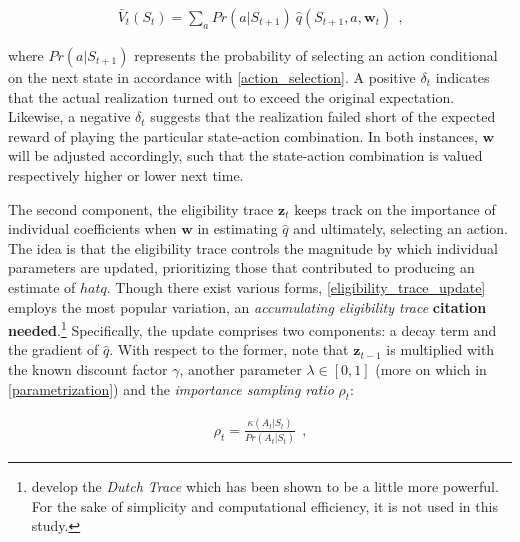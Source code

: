 \begin{gather}\label{expected_state_value}
\bar{V}_t(S_t) = \sum_{a} Pr(a|S_{t+1}) ~ \hat{q}(S_{t+1}, a, \boldsymbol{w}_t) ~~   \text{,}
\end{gather}

where $Pr(a|S_{t+1})$ represents the probability of selecting an action conditional on the next state in accordance with \autoref{action_selection}. A positive $\delta_t$ indicates that the actual realization turned out to exceed the original expectation. Likewise, a negative $\delta_t$ suggests that the realization failed short of the expected reward of playing the particular state-action combination. In both instances, $\boldsymbol{w}$ will be adjusted accordingly, such that the state-action combination is valued respectively higher or lower next time.

The second component, the eligibility trace $\boldsymbol{z}_t$ keeps track on the importance of individual coefficients when $\boldsymbol{w}$ in estimating $\hat{q}$ and ultimately, selecting an action. The idea is that the eligibility trace controls the magnitude by which individual parameters are updated, prioritizing those that contributed to producing an estimate of $hat{q}$. Though there exist various forms, \autoref{eligibility_trace_update} employs the most popular variation, an \emph{accumulating eligibility trace} \textbf{citation needed}.\footnote{\textcite{seijen_true_2014} develop the \emph{Dutch Trace} which has been shown to be a little more powerful. For the sake of simplicity and computational efficiency, it is not used in this study.} Specifically, the update comprises two components: a decay term and the gradient of $\hat{q}$. With respect to the former, note that $\boldsymbol{z}_{t-1}$ is multiplied with the known discount factor $\gamma$, another parameter $\lambda \in [0,1]$ (more on which in \autoref{parametrization}) and the \emph{importance sampling ratio} $\rho_t$:

\begin{gather}
	 \rho_t = \frac{\kappa(A_t|S_{t})}{Pr(A_t|S_t)} ~~  \text{,}
\end{gather}

